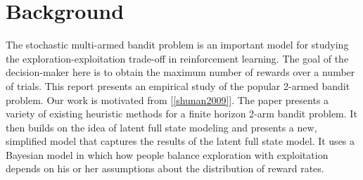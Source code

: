 \section{Background}
\label{background}

The stochastic multi-armed bandit problem is an important model for studying the exploration-exploitation trade-off in reinforcement learning. The goal of the decision-maker here is to obtain the maximum number of rewards over a number of trials. This report presents an empirical study of the popular 2-armed bandit problem. Our work is motivated from [\ref{shunan2009}]. The paper presents a variety of existing heuristic methods for a finite horizon 2-arm bandit problem. It then builds on the idea of latent full state modeling and presents a new, simplified model that captures the results of the latent full state model. It uses a Bayesian model in which how people balance exploration with exploitation depends on his or her assumptions about the distribution of reward rates. 



 